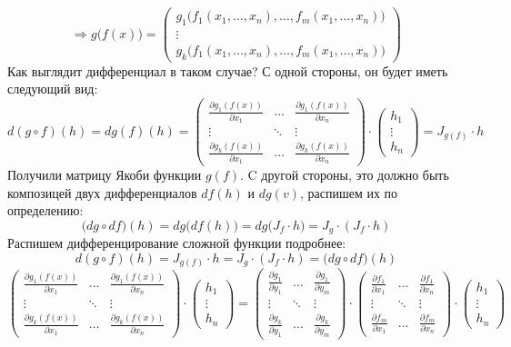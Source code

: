 \documentclass[12pt]{article}
\theoremstyle{definition}
\begin{document}
$$
	\Rightarrow	g\big(f(x)\big) = 
	\begin{pmatrix}
		g_1\big(f_1(x_1,\dotsc, x_n),  \dotsc, f_m(x_1, \dotsc, x_n) \big)\\
		\vdots\\
		g_k\big(f_1(x_1,\dotsc, x_n),  \dotsc, f_m(x_1, \dotsc, x_n) \big)
	\end{pmatrix}
$$
Как выглядит дифференциал в таком случае? С одной стороны, он будет иметь следующий вид:
$$
	d(g\circ f)(h) = dg(f)(h) = \begin{pmatrix}
		\tfrac{\partial g_1(f(x))}{\partial x_1} &  \dotsc & \tfrac{\partial g_1(f(x))}{\partial x_n} \\
		\vdots & \ddots & \vdots \\
		\tfrac{\partial g_k(f(x))}{\partial x_1} & \dotsc & \tfrac{\partial g_k(f(x))}{\partial x_n} 			
	\end{pmatrix}{\cdot}
	\begin{pmatrix}
		h_1\\
		\vdots\\
		h_n
	\end{pmatrix} = J_{g(f)}{\cdot}h
$$
Получили матрицу Якоби функции $g(f)$. C другой стороны, это должно быть композицей двух дифференциалов $df(h)$ и $dg(v)$, распишем их по определению:
$$
	\big(dg \circ df\big) (h) = dg\big(df(h)\big) = dg \big(J_f{\cdot}h \big) = J_g{\cdot}(J_f{\cdot}h)
$$
Распишем дифференцирование сложной функции подробнее:
$$
	d(g\circ f)(h) =  J_{g(f)}{\cdot}h = J_g{\cdot}(J_f{\cdot}h) = \big(dg \circ df\big) (h)
$$
$$	
	\begin{pmatrix}
		\tfrac{\partial g_1(f(x))}{\partial x_1} &  \dotsc & \tfrac{\partial g_1(f(x))}{\partial x_n} \\
		\vdots & \ddots & \vdots \\
		\tfrac{\partial g_k(f(x))}{\partial x_1} & \dotsc & \tfrac{\partial g_k(f(x))}{\partial x_n} 			
	\end{pmatrix}{\cdot}
	\begin{pmatrix}
		h_1\\
		\vdots\\
		h_n
	\end{pmatrix} = 
	\begin{pmatrix}
		\tfrac{\partial g_1}{\partial y_1} &  \dotsc & \tfrac{\partial g_1}{\partial y_m} \\
		\vdots & \ddots & \vdots \\
		\tfrac{\partial g_k}{\partial y_1} & \dotsc & \tfrac{\partial g_k}{\partial 		y_m} 			
	\end{pmatrix}{\cdot}
	\begin{pmatrix}
		\tfrac{\partial f_1}{\partial x_1} &  \dotsc & \tfrac{\partial f_1}{\partial x_n} \\
		\vdots & \ddots & \vdots \\
		\tfrac{\partial f_m}{\partial x_1} & \dotsc & \tfrac{\partial f_m}{\partial x_n} 			
	\end{pmatrix}{\cdot}
	\begin{pmatrix}
		h_1\\
		\vdots\\
		h_n
	\end{pmatrix} 
$$
\end{document}
